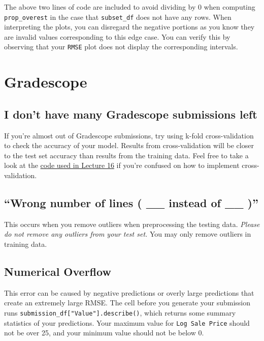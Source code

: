 \documentclass[
  letterpaper,
  DIV=11,
  numbers=noendperiod]{scrreprt}
\begin{document}
The above two lines of code are included to avoid dividing by 0 when
computing \texttt{prop\_overest} in the case that \texttt{subset\_df}
does not have any rows. When interpreting the plots, you can disregard
the negative portions as you know they are invalid values corresponding
to this edge case. You can verify this by observing that your
\texttt{RMSE} plot does not display the corresponding intervals.

\section{Gradescope}\label{gradescope-1}

\subsection{I don't have many Gradescope submissions
left}\label{i-dont-have-many-gradescope-submissions-left}

If you're almost out of Gradescope submissions, try using k-fold
cross-validation to check the accuracy of your model. Results from
cross-validation will be closer to the test set accuracy than results
from the training data. Feel free to take a look at the
\href{https://ds100.org/fa24/resources/assets/lectures/lec16/lec16.html}{code
used in Lecture 16} if you're confused on how to implement
cross-validation.

\subsection{``Wrong number of lines ( \_\_ instead of \_\_
)''}\label{wrong-number-of-lines-__-instead-of-__}

This occurs when you remove outliers when preprocessing the testing
data. \emph{Please do not remove any outliers from your test set.} You
may only remove outliers in training data.

\subsection{Numerical Overflow}\label{numerical-overflow}

This error can be caused by negative predictions or overly large
predictions that create an extremely large RMSE. The cell before you
generate your submission runs
\texttt{submission\_df{[}"Value"{]}.describe()}, which returns some
summary statistics of your predictions. Your maximum value for
\texttt{Log\ Sale\ Price} should not be over 25, and your minimum value
should not be below 0.
\end{document}
